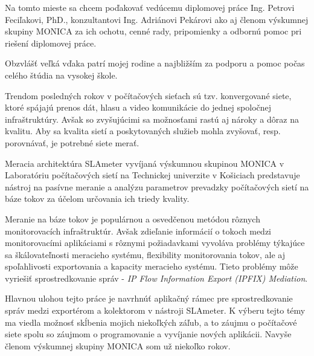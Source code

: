 \documentclass[]{tukediphc}
\begin{document}
\renewcommand\theHfigure{\theHsection.\arabic{figure}}
\renewcommand\theHtable{\theHsection.\arabic{table}}


\prvastrana

\titulnastrana

\abstraktsk %

\abstrakteng %

\kabstrakt %

% 
\zadanieprace

\cestnevyhlasenie

\podakovanie
Na tomto mieste sa chcem poďakovať vedúcemu diplomovej práce Ing. Petrovi 
Feciľakovi, PhD., konzultantovi Ing. Adriánovi Pekárovi ako aj členom 
výskumnej skupiny MONICA za ich ochotu, cenné
rady, pripomienky a odbornú pomoc pri riešení diplomovej práce.

Obzvlášť veľká vďaka patrí mojej rodine a najbližším za podporu a pomoc 
počas celého štúdia na vysokej škole.
\kpodakovania

\predhovor

Trendom posledných rokov v počítačových sieťach sú tzv. konvergované siete, ktoré spájajú prenos dát, 
hlasu a video komunikácie do jednej spoločnej infraštruktúry. Avšak so zvyšujúcimi sa možnosťami rastú 
aj nároky a dôraz na kvalitu. Aby sa kvalita sietí a poskytovaných služieb mohla zvyšovať, resp. 
porovnávať, je potrebné siete merať.

Meracia architektúra SLAmeter vyvíjaná výskumnou skupinou MONICA v Laboratóriu počítačových sietí na 
Technickej univerzite v Košiciach predstavuje nástroj na pasívne meranie a analýzu parametrov prevadzky
počítačových sietí na báze tokov za účelom určovania ich triedy kvality.

Meranie na báze tokov je populárnou a osvedčenou metódou rôznych monitorovacích infraštruktúr. Avšak 
zdieľanie informácií o tokoch medzi monitorovacími aplikáciami s rôznymi požiadavkami vyvoláva problémy 
týkajúce sa škálovateľnosti meracieho systému, flexibility monitorovania tokov, ale aj spoľahlivosti 
exportovania a kapacity meracieho systému. Tieto problémy môže vyriešiť sprostredkovanie správ -
\emph{IP Flow Information Export (IPFIX) Mediation}.

Hlavnou ulohou tejto práce je navrhnúť aplikačný rámec pre sprostredkovanie správ medzi exportérom a kolektorom
v nástroji SLAmeter. K výberu tejto témy ma viedla možnosť skĺbenia mojich niekoľkých záľub, a to 
záujmu o počítačové siete spolu so záujmom o programovanie a vyvíjanie nových aplikácii. Navyše členom 
výskumnej skupiny MONICA som už niekoľko rokov.
\end{document}
